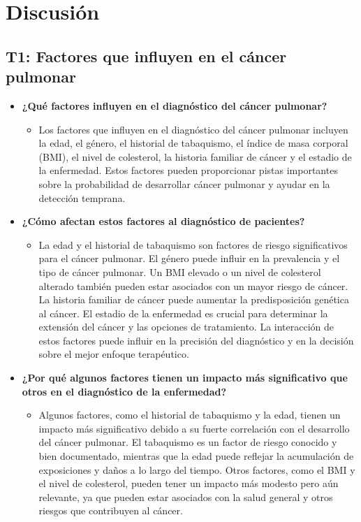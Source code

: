 \documentclass[10pt,journal,compsoc]{IEEEtran}
\begin{document}
\section{Discusión}

\subsection*{T1: Factores que influyen en el cáncer pulmonar}

\begin{itemize}
    \item \textbf{¿Qué factores influyen en el diagnóstico del cáncer pulmonar?}
    \begin{itemize}
        \item Los factores que influyen en el diagnóstico del cáncer pulmonar incluyen la edad, el género, el historial de tabaquismo, el índice de masa corporal (BMI), el nivel de colesterol, la historia familiar de cáncer y el estadio de la enfermedad. Estos factores pueden proporcionar pistas importantes sobre la probabilidad de desarrollar cáncer pulmonar y ayudar en la detección temprana.
    \end{itemize}

    \item \textbf{¿Cómo afectan estos factores al diagnóstico de pacientes?}
    \begin{itemize}
        \item La edad y el historial de tabaquismo son factores de riesgo significativos para el cáncer pulmonar. El género puede influir en la prevalencia y el tipo de cáncer pulmonar. Un BMI elevado o un nivel de colesterol alterado también pueden estar asociados con un mayor riesgo de cáncer. La historia familiar de cáncer puede aumentar la predisposición genética al cáncer. El estadio de la enfermedad es crucial para determinar la extensión del cáncer y las opciones de tratamiento. La interacción de estos factores puede influir en la precisión del diagnóstico y en la decisión sobre el mejor enfoque terapéutico.
    \end{itemize}

    \item \textbf{¿Por qué algunos factores tienen un impacto más significativo que otros en el diagnóstico de la enfermedad?}
    \begin{itemize}
        \item Algunos factores, como el historial de tabaquismo y la edad, tienen un impacto más significativo debido a su fuerte correlación con el desarrollo del cáncer pulmonar. El tabaquismo es un factor de riesgo conocido y bien documentado, mientras que la edad puede reflejar la acumulación de exposiciones y daños a lo largo del tiempo. Otros factores, como el BMI y el nivel de colesterol, pueden tener un impacto más modesto pero aún relevante, ya que pueden estar asociados con la salud general y otros riesgos que contribuyen al cáncer.
    \end{itemize}
\end{itemize}
\end{document}
